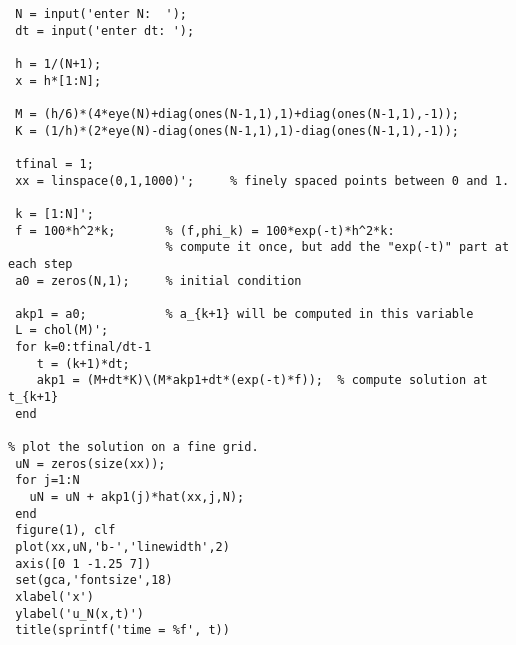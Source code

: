 {\footnotesize \begin{verbatim}
 N = input('enter N:  ');
 dt = input('enter dt: ');

 h = 1/(N+1);
 x = h*[1:N];

 M = (h/6)*(4*eye(N)+diag(ones(N-1,1),1)+diag(ones(N-1,1),-1));
 K = (1/h)*(2*eye(N)-diag(ones(N-1,1),1)-diag(ones(N-1,1),-1));

 tfinal = 1;
 xx = linspace(0,1,1000)';     % finely spaced points between 0 and 1.

 k = [1:N]';
 f = 100*h^2*k;       % (f,phi_k) = 100*exp(-t)*h^2*k:  
                      % compute it once, but add the "exp(-t)" part at each step
 a0 = zeros(N,1);     % initial condition

 akp1 = a0;           % a_{k+1} will be computed in this variable
 L = chol(M)';
 for k=0:tfinal/dt-1
    t = (k+1)*dt;
    akp1 = (M+dt*K)\(M*akp1+dt*(exp(-t)*f));  % compute solution at t_{k+1}
 end

% plot the solution on a fine grid.
 uN = zeros(size(xx));
 for j=1:N
   uN = uN + akp1(j)*hat(xx,j,N);
 end
 figure(1), clf 
 plot(xx,uN,'b-','linewidth',2)
 axis([0 1 -1.25 7])
 set(gca,'fontsize',18)
 xlabel('x')
 ylabel('u_N(x,t)')
 title(sprintf('time = %f', t))
\end{verbatim}}
